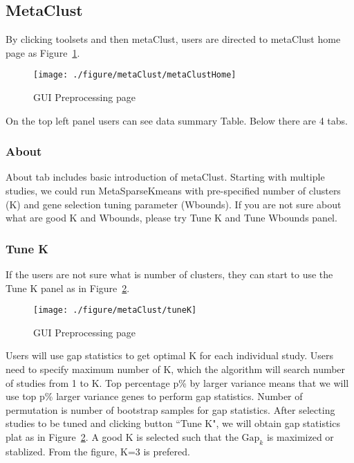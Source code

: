 \subsection{MetaClust}
By clicking toolsets and then metaClust,
users are directed to metaClust home page as Figure~\ref{fig:metaClustHome}.
\begin{figure}[H]
\begin{center}
\texttt{[image: ./figure/metaClust/metaClustHome]}
\caption{GUI Preprocessing page}
\label{fig:metaClustHome}
\end{center}
\end{figure}
On the top left panel users can see data summary Table.
Below there are 4 tabs.
\subsubsection{About}
About tab includes basic introduction of metaClust.
Starting with multiple studies, 
we could run MetaSparseKmeans with pre-specified number of clusters (K) and gene selection tuning parameter (Wbounds).
If you are not sure about what are good K and Wbounds, please try Tune K and Tune Wbounds panel.

\subsubsection{Tune K}
If the users are not sure what is number of clusters,
they can start to use the Tune K panel as in Figure~\ref{fig:metaClusttuneK}.
\begin{figure}[H]
\begin{center}
\texttt{[image: ./figure/metaClust/tuneK]}
\caption{GUI Preprocessing page}
\label{fig:metaClusttuneK}
\end{center}
\end{figure}
Users will use gap statistics to get optimal K for each individual study.
Users need to specify maximum number of K, which the algorithm will search number of studies from 1 to K.
Top percentage p\% by larger variance means that we will use top p\% larger variance genes to perform gap statistics.
Number of permutation is number of bootstrap samples for gap statistics.
After selecting studies to be tuned and clicking button ``Tune K",
we will obtain gap statistics plat as in Figure~\ref{fig:metaClusttuneK}.
A good K is selected such that the $\mbox{Gap}_k$ is maximized or stablized.
From the figure, K=3 is prefered.


